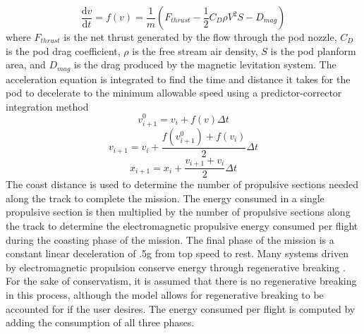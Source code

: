 	\begin{equation}
		\label{eq:acceleration}
		\frac{\mathrm{d} v}{\mathrm{d} t} = f ( v  ) = \frac{1}{m} ( F_{thrust} - \frac{1}{2}C_{D}\rho V^{2}S - D_{mag})
	\end{equation}
	where $F_{thrust}$ is the net thrust generated by the flow through the pod nozzle, $C_D$  is the pod drag coefficient, $\rho$ is the free stream air density, $S$ is the pod planform area, and $D_{mag}$ is the drag produced by the magnetic levitation system. The acceleration equation is integrated to find the time and distance it takes for the pod to decelerate to the minimum allowable speed using a predictor-corrector integration method 
	\begin{equation}
		\label{eq:predictor_corrector}
		v_{i+1}^{0} = v_{i}+f(v)\Delta t
	\end{equation}
	\begin{equation}
		\label{eq:predictor_corrector_2}
		v_{i+1} = v_{i}+\frac{f(v_{i+1}^{0})+f(v_{i})}{2}\Delta t
	\end{equation}
	\begin{equation}
		\label{eq:predictor_corrector_3}
		x_{i+1} = x_{i}+\frac{v_{i+1}+v_{i}}{2}\Delta t
	\end{equation}
	The coast distance is used to determine the number of propulsive sections needed along the track to complete the mission. The energy consumed in a single propulsive section is then multiplied by the number of propulsive sections along the track to determine the electromagnetic propulsive energy consumed per flight during the coasting phase of the mission. The final phase of the mission is a constant linear deceleration of .5g from top speed to rest. Many systems driven by electromagnetic propulsion conserve energy through regenerative breaking \cite{inductrack}. For the sake of conservatism, it is assumed that there is no regenerative breaking in this process, although the model allows for regenerative breaking to be accounted for if the user desires. The energy consumed per flight is computed by adding the consumption of all three phases.

